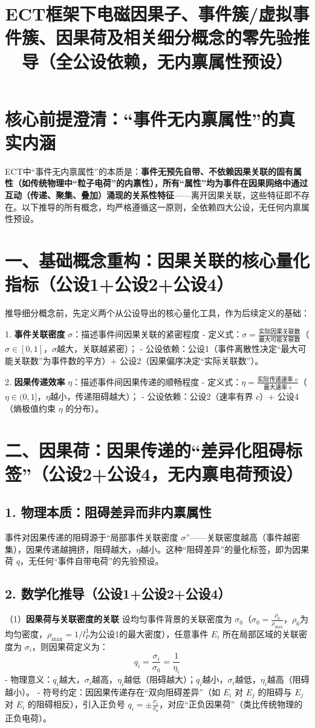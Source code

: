 \documentclass{article}
\title{ECT框架下电磁因果子、事件簇/虚拟事件簇、因果荷及相关细分概念的零先验推导（全公设依赖，无内禀属性预设）}
\author{}
\date{}
\begin{document}
\maketitle

\section*{核心前提澄清：“事件无内禀属性”的真实内涵}
ECT中“事件无内禀属性”的本质是：\textbf{事件无预先自带、不依赖因果关联的固有属性（如传统物理中“粒子电荷”的内禀性），所有“属性”均为事件在因果网络中通过互动（传递、聚集、叠加）涌现的关系性特征}——离开因果关联，这些特征即不存在。以下推导的所有概念，均严格遵循这一原则，全依赖四大公设，无任何内禀属性预设。


\section*{一、基础概念重构：因果关联的核心量化指标（公设1+公设2+公设4）}
推导细分概念前，先定义两个从公设导出的核心量化工具，作为后续定义的基础：

1. \textbf{事件关联密度} $\sigma$：描述事件间因果关联的紧密程度  
   - 定义式：$\sigma = \frac{\text{实际因果关联数}}{\text{最大可能关联数}}$（$\sigma \in [0,1]$，$\sigma$越大，关联越紧密）；  
   - 公设依赖：公设1（事件离散性决定“最大可能关联数”为事件数的平方）+ 公设2（因果偏序决定“实际关联数”）。

2. \textbf{因果传递效率} $\eta$：描述事件间因果传递的顺畅程度  
   - 定义式：$\eta = \frac{\text{实际传递速率 } v}{\text{最大速率 } c}$（$\eta \in (0,1]$，$\eta$越小，传递阻碍越大）；  
   - 公设依赖：公设2（速率有界 $c$）+ 公设4（熵极值约束 $\eta$ 的分布）。


\section*{二、因果荷：因果传递的“差异化阻碍标签”（公设2+公设4，无内禀电荷预设）}

\subsection*{1. 物理本质：阻碍差异而非内禀属性}
事件对因果传递的阻碍源于“局部事件关联密度 $\sigma$”——关联密度越高（事件越密集），因果传递越拥挤，阻碍越大，$\eta$越小。这种“阻碍差异”的量化标签，即为因果荷 $q$，无任何“事件自带电荷”的先验预设。

\subsection*{2. 数学化推导（公设1+公设2+公设4）}
（1）\textbf{因果荷与关联密度的关联}  
设均匀事件背景的关联密度为 $\sigma_0$（$\sigma_0 = \frac{\rho_0}{\rho_{\text{max}}}$，$\rho_0$为均匀密度，$\rho_{\text{max}}=1/l_P^3$为公设1的最大密度），任意事件 $E_i$ 所在局部区域的关联密度为 $\sigma_i$，则因果荷定义为：
\[
\boxed{q_i = \frac{\sigma_i}{\sigma_0} = \frac{1}{\eta_i}}
\]
- 物理意义：$q_i$越大，$\sigma_i$越高，$\eta_i$越低（阻碍越大）；$q_i$越小，$\sigma_i$越低，$\eta_i$越高（阻碍越小）。  
- 符号约定：因因果传递存在“双向阻碍差异”（如 $E_i$ 对 $E_j$ 的阻碍与 $E_j$ 对 $E_i$ 的阻碍相反），引入正负号 $q_i = \pm \frac{\sigma_i}{\sigma_0}$，对应“正负因果荷”（类比传统物理的正负电荷）。
\end{document}
